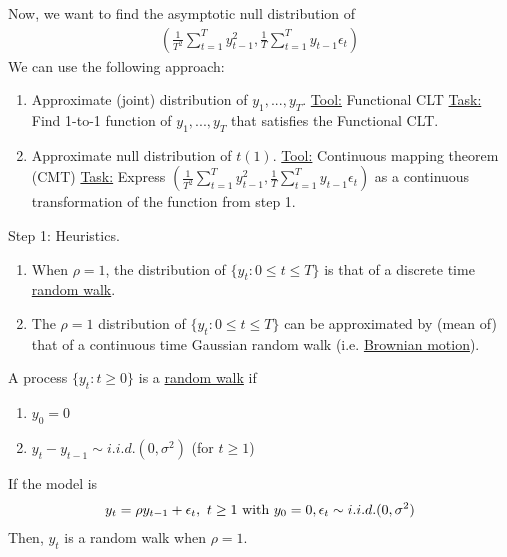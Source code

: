 \documentclass[11pt]{elegantbook}
\begin{document}
Now, we want to find the asymptotic null distribution of
\begin{equation}
    \begin{aligned}
        \left(\frac{1}{T^2}\sum_{t=1}^Ty_{t-1}^2,\frac{1}{T}\sum_{t=1}^Ty_{t-1}\epsilon_t\right)
    \end{aligned}
    \nonumber
\end{equation}
We can use the following approach:
\begin{enumerate}[Step 1.]
    \item Approximate (joint) distribution of $y_1,...,y_T$.
    \subitem \underline{Tool:} Functional CLT
    \subitem \underline{Task:} Find 1-to-1 function of $y_1,...,y_T$ that satisfies the Functional CLT.
    \item Approximate null distribution of $t(1)$.
    \subitem \underline{Tool:} Continuous mapping theorem (CMT)
    \subitem \underline{Task:} Express $\left(\frac{1}{T^2}\sum_{t=1}^Ty_{t-1}^2,\frac{1}{T}\sum_{t=1}^Ty_{t-1}\epsilon_t\right)$ as a continuous transformation of the function from step 1.
\end{enumerate}

Step 1: Heuristics.
\begin{enumerate}
    \item When $\rho=1$, the distribution of $\{y_t:0\leq t\leq T\}$ is that of a discrete time \underline{random walk}.
    \item The $\rho=1$ distribution of $\{y_t:0\leq t\leq T\}$ can be approximated by (mean of) that of a continuous time Gaussian random walk (i.e. \underline{Brownian motion}).
\end{enumerate}
\begin{definition}
    A process $\{y_t:t\geq 0\}$ is a \underline{random walk} if
    \begin{enumerate}
        \item $y_0=0$
        \item $y_t-y_{t-1}\sim i.i.d. (0,\sigma^2)$ (for $t\geq 1$)
    \end{enumerate}
\end{definition}
If the model is
\begin{equation}
    \begin{aligned}
        y_t=\rho y_{t-1}+\epsilon_t,\ t\geq 1 \textnormal{ with }y_0=0, \epsilon_t\sim i.i.d. (0,\sigma^2)
    \end{aligned}
    \nonumber
\end{equation}
Then, $y_t$ is a random walk when $\rho=1$.
\end{document}
